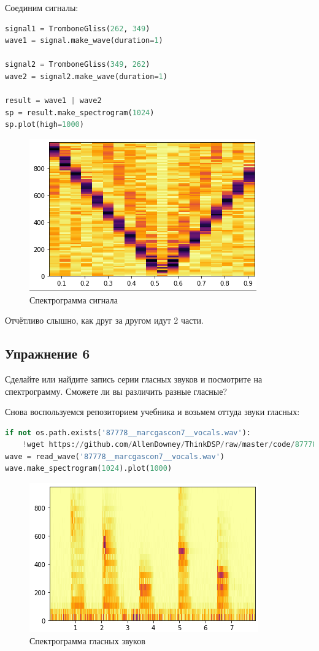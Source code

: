 Соединим сигналы:
\begin{lstlisting}[language=Python]
signal1 = TromboneGliss(262, 349)
wave1 = signal.make_wave(duration=1)

signal2 = TromboneGliss(349, 262)
wave2 = signal2.make_wave(duration=1)

result = wave1 | wave2
sp = result.make_spectrogram(1024)
sp.plot(high=1000)
\end{lstlisting}
\begin{figure}[H]
	\begin{center}
		\includegraphics[scale=1]{fig/lab03/lab3_9.png}
		\caption{Спектрограмма сигнала}
	\end{center}
\end{figure}

Отчётливо слышно, как друг за другом идут 2 части.


\subsection{Упражнение 6}

Сделайте или найдите запись серии гласных звуков и посмотрите на спектрограмму. Сможете ли вы различить разные гласные?

Снова воспользуемся репозиторием учебника и возьмем оттуда звуки гласных:

\begin{lstlisting}[language=Python]
if not os.path.exists('87778__marcgascon7__vocals.wav'):
    !wget https://github.com/AllenDowney/ThinkDSP/raw/master/code/87778__marcgascon7__vocals.wav
wave = read_wave('87778__marcgascon7__vocals.wav')
wave.make_spectrogram(1024).plot(1000)
\end{lstlisting}
\begin{figure}[H]
	\begin{center}
		\includegraphics[scale=1]{fig/lab03/lab3_10.png}
		\caption{Спектрограмма гласных звуков}
	\end{center}
\end{figure}

